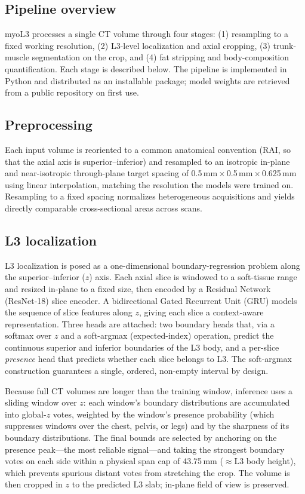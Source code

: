\documentclass{article}
\begin{document}
\subsection{Pipeline overview}
myoL3 processes a single CT volume through four stages: (1) resampling to a
fixed working resolution, (2) L3-level localization and axial cropping, (3)
trunk-muscle segmentation on the crop, and (4) fat stripping and
body-composition quantification. Each stage is described below. The pipeline is
implemented in Python and distributed as an installable package; model weights
are retrieved from a public repository on first use.

\subsection{Preprocessing}
Each input volume is reoriented to a common anatomical convention (RAI, so that
the axial axis is superior--inferior) and resampled to an isotropic in-plane and
near-isotropic through-plane target spacing of
0.5\,mm\,$\times$\,0.5\,mm\,$\times$\,0.625\,mm
using linear interpolation, matching the resolution the models were trained on.
Resampling to a fixed spacing normalizes heterogeneous acquisitions and yields
directly comparable cross-sectional areas across scans.

\subsection{L3 localization}
L3 localization is posed as a one-dimensional boundary-regression problem along
the superior--inferior ($z$) axis. Each axial slice is windowed to a
soft-tissue range and resized in-plane to a fixed size, then encoded by a
Residual Network (ResNet-18) slice encoder. A bidirectional Gated Recurrent Unit
(GRU) models the sequence of slice features along $z$, giving each slice a
context-aware representation. Three heads are attached: two boundary heads that,
via a softmax over $z$ and a soft-argmax (expected-index) operation, predict the
continuous superior and inferior boundaries of the L3 body, and a per-slice
\emph{presence} head that predicts whether each slice belongs to L3. The
soft-argmax construction guarantees a single, ordered, non-empty interval by
design.

Because full CT volumes are longer than the training window, inference uses a
sliding window over $z$: each window's boundary distributions are accumulated
into global-$z$ votes, weighted by the window's presence probability (which
suppresses windows over the chest, pelvis, or legs) and by the sharpness of its
boundary distributions. The final bounds are selected by anchoring on the
presence peak---the most reliable signal---and taking the strongest boundary
votes on each side within a physical span cap of 43.75\,mm
($\approx$L3 body height), which prevents spurious distant votes from stretching
the crop. The volume is then cropped in $z$ to the predicted L3 slab; in-plane
field of view is preserved.
\end{document}
